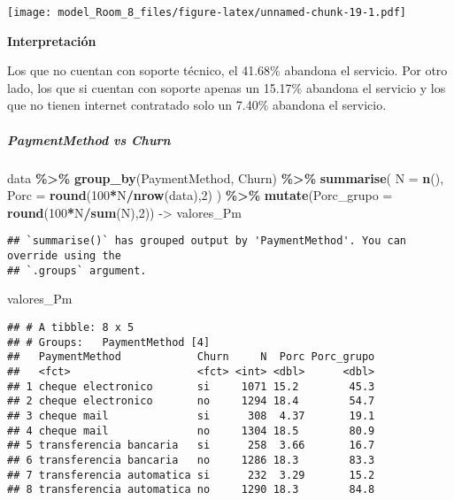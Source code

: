 \documentclass[
]{article}
\newenvironment{Shaded}{\begin{snugshade}}{\end{snugshade}}
\newcommand{\AttributeTok}[1]{\textcolor[rgb]{0.13,0.29,0.53}{#1}}
\newcommand{\DecValTok}[1]{\textcolor[rgb]{0.00,0.00,0.81}{#1}}
\newcommand{\FunctionTok}[1]{\textcolor[rgb]{0.13,0.29,0.53}{\textbf{#1}}}
\newcommand{\NormalTok}[1]{#1}
\newcommand{\OtherTok}[1]{\textcolor[rgb]{0.56,0.35,0.01}{#1}}
\newcommand{\SpecialCharTok}[1]{\textcolor[rgb]{0.81,0.36,0.00}{\textbf{#1}}}
\begin{document}
\texttt{[image: model\_Room\_8\_files/figure-latex/unnamed-chunk-19-1.pdf]}

\textbf{Interpretación}

Los que no cuentan con soporte técnico, el 41.68\% abandona el servicio.
Por otro lado, los que si cuentan con soporte apenas un 15.17\% abandona
el servicio y los que no tienen internet contratado solo un 7.40\%
abandona el servicio.

\hypertarget{paymentmethod-vs-churn}{%
\subparagraph{PaymentMethod vs Churn}\label{paymentmethod-vs-churn}}

\begin{Shaded}
\begin{Highlighting}[]
\NormalTok{data }\SpecialCharTok{\%\textgreater{}\%}
  \FunctionTok{group\_by}\NormalTok{(PaymentMethod, Churn) }\SpecialCharTok{\%\textgreater{}\%}
  \FunctionTok{summarise}\NormalTok{(}
    \AttributeTok{N =} \FunctionTok{n}\NormalTok{(),}
    \AttributeTok{Porc =} \FunctionTok{round}\NormalTok{(}\DecValTok{100}\SpecialCharTok{*}\NormalTok{N}\SpecialCharTok{/}\FunctionTok{nrow}\NormalTok{(data),}\DecValTok{2}\NormalTok{)}
\NormalTok{  ) }\SpecialCharTok{\%\textgreater{}\%}
  \FunctionTok{mutate}\NormalTok{(}\AttributeTok{Porc\_grupo =} \FunctionTok{round}\NormalTok{(}\DecValTok{100}\SpecialCharTok{*}\NormalTok{N}\SpecialCharTok{/}\FunctionTok{sum}\NormalTok{(N),}\DecValTok{2}\NormalTok{)) }\OtherTok{{-}\textgreater{}}\NormalTok{ valores\_Pm}
\end{Highlighting}
\end{Shaded}

\begin{verbatim}
## `summarise()` has grouped output by 'PaymentMethod'. You can override using the
## `.groups` argument.
\end{verbatim}

\begin{Shaded}
\begin{Highlighting}[]
\NormalTok{valores\_Pm}
\end{Highlighting}
\end{Shaded}

\begin{verbatim}
## # A tibble: 8 x 5
## # Groups:   PaymentMethod [4]
##   PaymentMethod            Churn     N  Porc Porc_grupo
##   <fct>                    <fct> <int> <dbl>      <dbl>
## 1 cheque electronico       si     1071 15.2        45.3
## 2 cheque electronico       no     1294 18.4        54.7
## 3 cheque mail              si      308  4.37       19.1
## 4 cheque mail              no     1304 18.5        80.9
## 5 transferencia bancaria   si      258  3.66       16.7
## 6 transferencia bancaria   no     1286 18.3        83.3
## 7 transferencia automatica si      232  3.29       15.2
## 8 transferencia automatica no     1290 18.3        84.8
\end{verbatim}
\end{document}
